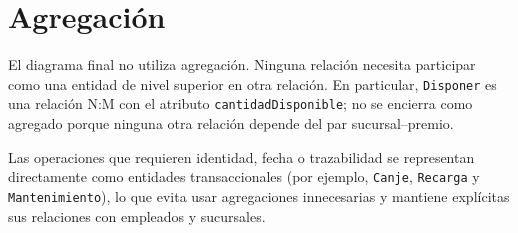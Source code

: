 \section{Agregación}

El diagrama final no utiliza agregación. Ninguna relación necesita
participar como una entidad de nivel superior en otra relación. En particular,
\texttt{Disponer} es una relación N:M con el atributo
\texttt{cantidadDisponible}; no se encierra como agregado porque ninguna otra
relación depende del par sucursal--premio.

Las operaciones que requieren identidad, fecha o trazabilidad se representan
directamente como entidades transaccionales (por ejemplo, \texttt{Canje},
\texttt{Recarga} y \texttt{Mantenimiento}), lo que evita usar agregaciones
innecesarias y mantiene explícitas sus relaciones con empleados y sucursales.
